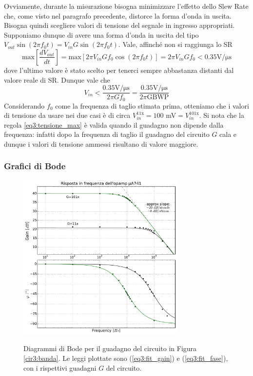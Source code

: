Ovviamente, durante la misurazione bisogna minimizzare l'effetto dello Slew Rate che, come visto nel paragrafo precedente, distorce la forma d'onda in uscita. Bisogna quindi scegliere valori di tensione del segnale in ingresso appropriati.
Supponiamo dunque di avere una forma d'onda in uscita del tipo $V_{out} \sin (2 \pi f_0 t) = V_{in} G \sin (2 \pi f_0 t)$. Vale, affinché non si raggiunga lo SR
$$\mathrm{max}\left[ \frac{dV_{out}}{dt} \right] = \mathrm{max} \left[ 2 \pi V_{in} G f_0 \cos (2 \pi f_0 t) \right]= 2 \pi V_{in} G f_0 < 0.35 \si{\volt\per\micro\second}$$
dove l'ultimo valore è stato scelto per tenerci sempre abbastanza distanti dal valore reale di SR. Dunque vale che
\begin{equation}
V_{in}<\frac{0.35 \si{\volt\per\micro\second}}{2 \pi G f_0} = \frac{0.35 \si{\volt\per\micro\second}}{2 \pi \mathrm{GBWP}}
\label{eq3:tensione_max}
\end{equation}
Considerando $f_0$ come la frequenza di taglio stimata prima, otteniamo che i valori di tensione da usare nei due casi è di circa $V_{in}^{11\mathrm{x}} = 100$ \si{\milli\volt}$= V_{in}^{101\mathrm{x}}$. Si nota che la regola \ref{eq3:tensione_max} è valida quando il guadagno non dipende dalla frequenza: infatti dopo la frequenza di taglio il guadagno del circuito $G$ cala e dunque i valori di tensione ammessi risultano di valore maggiore.

\subsubsection*{Grafici di Bode}
\label{par3:sub_bode}

\begin{figure}[ht]
 \centering
   {\includegraphics[width=0.75\textwidth]{../E03/latex/bode.pdf}}
 \caption{Diagrammi di Bode per il guadagno del circuito in Figura \ref{cir3:banda}. Le leggi plottate sono (\ref{eq3:fit_gain}) e (\ref{eq3:fit_fase}), con i rispettivi guadagni $G$ del circuito.}
 \label{gr3:bode}
\end{figure}

